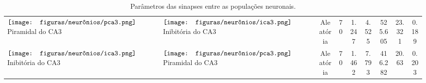 \begin{table}[h!]
{\begin{tabular}{llccccccc}
$\vcenter{\hbox{\texttt{[image: figuras/neurônios/pca3.png]}}}$ Piramidal do CA3 & $\vcenter{\hbox{\texttt{[image: figuras/neurônios/ica3.png]}}}$ Inibitória do CA3 & Aleatória & 70 & 1.247 & 4.525 & 525.605 & 23.321 & 0.189 \\
$\vcenter{\hbox{\texttt{[image: figuras/neurônios/ica3.png]}}}$ Inibitória do CA3 & $\vcenter{\hbox{\texttt{[image: figuras/neurônios/pca3.png]}}}$ Piramidal do CA3 & Aleatória & 70 & 1.462 & 7.793 & 416.282 & 20.63 & 0.203 \\
\bottomrule
\end{tabular}}
\caption{Parâmetros das sinapses entre as populações neuronais.}\label{tab:synapse_params}
\end{table}
